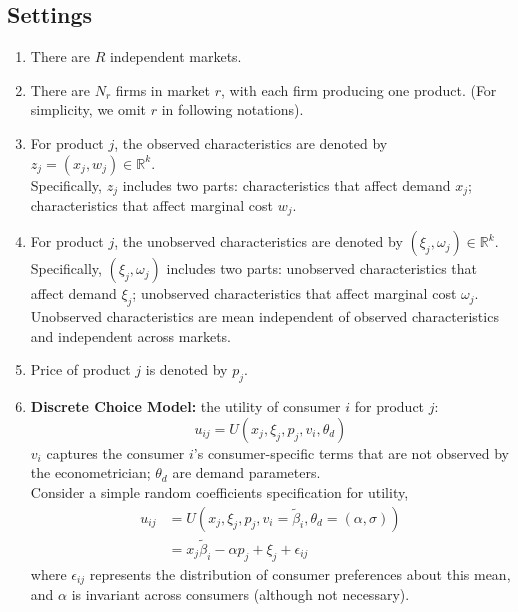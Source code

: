 \documentclass[11pt]{elegantbook}
\begin{document}
\subsection{Settings}
\begin{enumerate}
    \item There are $R$ independent markets.
    \item There are $N_r$ firms in market $r$, with each firm producing one product. (For simplicity, we omit $r$ in following notations).
    \item For product $j$, the observed characteristics are denoted by $z_{j}=(x_j,w_j)\in \mathbb{R}^k$.\\ Specifically, $z_j$ includes two parts:
    \subitem characteristics that affect demand $x_j$;
    \subitem characteristics that affect marginal cost $w_j$.
    \item For product $j$, the unobserved characteristics are denoted by $(\xi_j,\omega_j)\in \mathbb{R}^k$.\\ Specifically, $(\xi_j,\omega_j)$ includes two parts:
    \subitem unobserved characteristics that affect demand $\xi_j$;
    \subitem unobserved characteristics that affect marginal cost $\omega_j$.\\
    Unobserved characteristics are mean independent of observed characteristics and independent across markets.
    \item Price of product $j$ is denoted by $p_j$.
    \item \textbf{Discrete Choice Model:} the utility of consumer $i$ for product $j$: $$u_{ij}=U(x_j,\xi_j,p_j,v_i,\theta_d)$$
    \subitem $v_i$ captures the consumer $i$'s consumer-specific terms that are not observed by the econometrician;
    \subitem $\theta_d$ are demand parameters.\\
    Consider a simple random coefficients specification for utility,
    \begin{equation}
        \begin{aligned}
            u_{ij}&=U(x_j,\xi_j,p_j,v_i=\tilde{\beta}_i,\theta_d=(\alpha,\sigma))\\
            &=x_j\tilde{\beta}_i-\alpha p_j+\xi_j+\epsilon_{ij}
        \end{aligned}
        \tag{(2)}
        \label{(2)}
    \end{equation}
    where $\epsilon_{ij}$ represents the distribution of consumer preferences about this mean, and $\alpha$ is invariant across consumers (although not necessary).\\

\end{enumerate}
\end{document}
